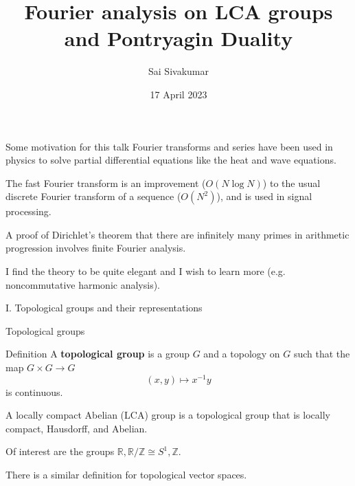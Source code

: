 \documentclass[mathserif
]{beamer}
\title
{\textcolor{black!85}{Fourier analysis on LCA groups and Pontryagin Duality}}
\author[Sai Sivakumar]{Sai Sivakumar}
\date{17 April 2023}
\begin{document}
\frame{\titlepage}

\begin{frame}{Some motivation for this talk}
    Fourier transforms and series have been used in physics to solve partial differential equations like the heat and wave equations. %
    \pause

    The fast Fourier transform is an improvement ($O(N\log N)$) to the usual discrete Fourier transform of a sequence ($O(N^2)$), and is used in signal processing. %
    \pause

    A proof of Dirichlet's theorem that there are infinitely many primes in arithmetic progression involves finite Fourier analysis.
    \pause

    I find the theory to be quite elegant and I wish to learn more (e.g. noncommutative harmonic analysis).
\end{frame}

\begin{frame}{}
    \begin{block}{}{
        \begin{center}\Large I. Topological groups and their representations\end{center}}
    \end{block}
\end{frame}

\begin{frame}{Topological groups}
    \begin{block}{Definition}
        A \textbf{topological group} is a group $G$ and a topology on $G$ such that the map $G\times G\to G$ \[(x,y)\mapsto x^{-1}y\] is continuous.
    \end{block} 
    \pause

    A locally compact Abelian (LCA) group is a topological group that is locally compact, Hausdorff, and Abelian.
    \pause

    Of interest are the groups $\mathbb{R}, \mathbb{R}/\mathbb{Z}\cong S^1, \mathbb{Z}$.
    \pause

    There is a similar definition for topological vector spaces.
\end{frame}
\end{document}
